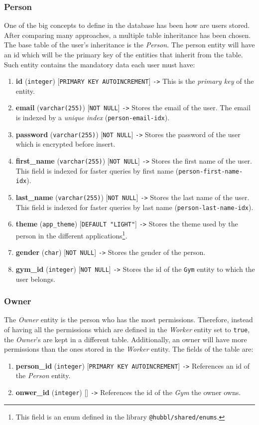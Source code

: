\documentclass[a4paper, 12pt, oneside]{book}
\begin{document}
\subsubsection{Person}
One of the big concepts to define in the database has been how are users stored. After comparing many approaches, a multiple table inheritance has been chosen. The base table of the user's inheritance is the \emph{Person}. The person entity will have an id which will be the primary key of the entities that inherit from the table. Such entity contains the mandatory data each user must have:
\begin{enumerate}[label = -]
	\item \textbf{id} (\texttt{integer}) [\texttt{PRIMARY KEY AUTOINCREMENT}] \texttt{->} This is the \emph{primary key} of the entity.
	\item \textbf{email} (\texttt{varchar(255)}) [\texttt{NOT NULL}] \texttt{->} Stores the email of the user. The email is indexed by a \emph{unique index} (\texttt{person-email-idx}).
	\item \textbf{password} (\texttt{varchar(255)}) [\texttt{NOT NULL}] \texttt{->} Stores the password of the user which is encrypted before insert.
	\item \textbf{first\_name} (\texttt{varchar(255)}) [\texttt{NOT NULL}] \texttt{->} Stores the first name of the user. This field is indexed for faster queries by first name (\texttt{person-first-name-idx}).
	\item \textbf{last\_name} (\texttt{varchar(255)}) [\texttt{NOT NULL}] \texttt{->} Stores the last name of the user. This field is indexed for faster queries by last name (\texttt{person-last-name-idx}).
	\item \textbf{theme} (\texttt{app\_theme}) [\texttt{DEFAULT "LIGHT"}] \texttt{->} Stores the theme used by the person in the different applications\footnote{This field is an enum defined in the library \texttt{@hubbl/shared/enums}.}.
	\item \textbf{gender} (\texttt{char}) [\texttt{NOT NULL}] \texttt{->} Stores the gender of the person.
	\item \textbf{gym\_id} (\texttt{integer}) [\texttt{NOT NULL}] \texttt{->} Stores the id of the \texttt{Gym} entity to which the user belongs.
\end{enumerate}
\subsubsection{Owner}
The \emph{Owner} entity is the person who has the most permissions. Therefore, instead of having all the permissions which are defined in the \emph{Worker} entity set to \texttt{true}, the \emph{Owner}'s are kept in a different table. Additionally, an owner will have more permissions than the ones stored in the \emph{Worker} entity. The fields of the table are:
\begin{enumerate}[label = -]
	\item \textbf{person\_id} (\texttt{integer}) [\texttt{PRIMARY KEY AUTOINCREMENT}] \texttt{->} References an id of the \emph{Person} entity.
	\item \textbf{onwer\_id} (\texttt{integer}) [] \texttt{->} References the id of the \emph{Gym} the owner owns.
\end{enumerate}
\end{document}
